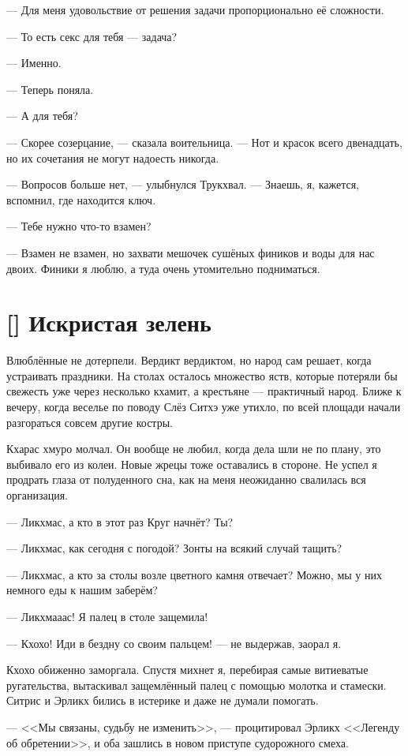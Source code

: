 --- Для меня удовольствие от решения задачи пропорционально её сложности.

--- То есть секс для тебя --- задача?

--- Именно.

--- Теперь поняла.

--- А для тебя?

--- Скорее созерцание, --- сказала воительница.
--- Нот и красок всего двенадцать, но их сочетания не могут надоесть никогда.

--- Вопросов больше нет, --- улыбнулся Трукхвал.
--- Знаешь, я, кажется, вспомнил, где находится ключ.

--- Тебе нужно что-то взамен?

--- Взамен не взамен, но захвати мешочек сушёных фиников и воды для нас двоих.
Финики я люблю, а туда очень утомительно подниматься.

\section{[] Искристая зелень}

Влюблённые не дотерпели.
Вердикт вердиктом, но народ сам решает, когда устраивать праздники.
На столах осталось множество яств, которые потеряли бы свежесть уже через несколько кхамит, а крестьяне --- практичный народ.
Ближе к вечеру, когда веселье по поводу Слёз Ситхэ уже утихло, по всей площади начали разгораться совсем другие костры.

Кхарас хмуро молчал.
Он вообще не любил, когда дела шли не по плану, это выбивало его из колеи.
Новые жрецы тоже оставались в стороне.
Не успел я продрать глаза от полуденного сна, как на меня неожиданно свалилась вся организация.

--- Ликхмас, а кто в этот раз Круг начнёт?
Ты?

--- Ликхмас, как сегодня с погодой?
Зонты на всякий случай тащить?

--- Ликхмас, а кто за столы возле цветного камня отвечает?
Можно, мы у них немного еды к нашим заберём?

--- Ликхмааас!
Я палец в столе защемила!

--- Кхохо!
Иди в бездну со своим пальцем! --- не выдержав, заорал я.

Кхохо обиженно заморгала.
Спустя михнет я, перебирая самые витиеватые ругательства, вытаскивал защемлённый палец с помощью молотка и стамески.
Ситрис и Эрликх бились в истерике и даже не думали помогать.

---  <<Мы связаны, судьбу не изменить>>, --- процитировал Эрликх <<Легенду об обретении>>, и оба зашлись в новом приступе судорожного смеха.

